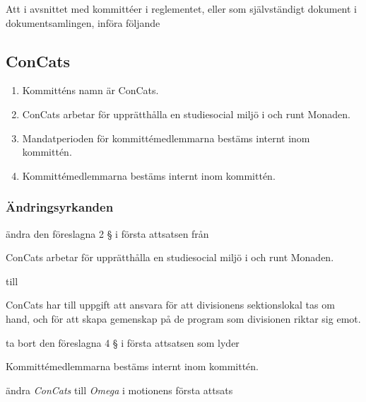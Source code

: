 \documentclass[protokoll]{dvd}
\begin{document}
        \begin{attsatser}
        \item Att i avsnittet med kommittéer i reglementet, eller som självständigt dokument i dokumentsamlingen, införa följande

        \begin{displayquote}
            \subsection*{ConCats}
            \begin{enumerate}[label=\arabic* §]
                \item Kommitténs namn är ConCats.

                \item ConCats arbetar för upprätthålla en studiesocial miljö i och runt Monaden.

                \item Mandatperioden för kommittémedlemmarna bestäms internt inom kommittén.

                \item Kommittémedlemmarna bestäms internt inom kommittén.
            \end{enumerate}
        \end{displayquote}
    \end{attsatser}

        \subsubsection*{Ändringsyrkanden}
        \begin{attsatser}
            \item ändra den föreslagna 2 § i första attsatsen från

               \begin{displayquote}
                   ConCats arbetar för upprätthålla en studiesocial miljö i och runt Monaden.
               \end{displayquote}
                till
               \begin{displayquote}
                   ConCats har till uppgift att ansvara för att divisionens sektionslokal tas om hand, och för att skapa gemenskap på de program som divisionen riktar sig emot.
               \end{displayquote}

            \item ta bort den föreslagna 4 § i första attsatsen som lyder

                \begin{displayquote}
                    Kommittémedlemmarna bestäms internt inom kommittén.
                \end{displayquote}
            \item ändra \emph{ConCats} till \emph{Omega} i motionens första attsats

        \end{attsatser}
\end{document}
